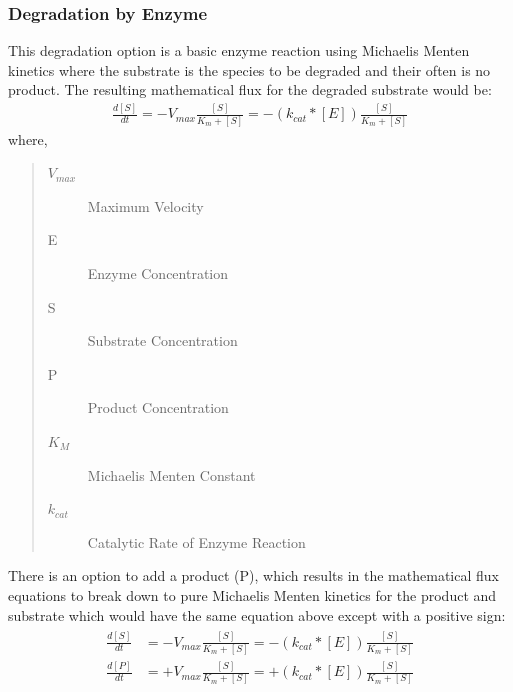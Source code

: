 \documentclass[letterpaper,10pt,english]{sphinxmanual}
\begin{document}
\subsubsection{Degradation by Enzyme}
\label{\detokenize{pages/backend/eqn_info/4_degradation:degradation-by-enzyme}}
\sphinxAtStartPar
This degradation option is a basic enzyme reaction using Michaelis Menten
kinetics where the substrate is the species to be degraded and their often
is no product. The resulting mathematical flux for the degraded substrate
would be:
\begin{equation*}
\begin{split}\frac{d[S]}{dt} = -V_{max}\frac{[S]}{K_m+[S]} =
-(k_{cat}*[E])\frac{[S]}{K_m+[S]}\end{split}
\end{equation*}
\sphinxAtStartPar
where,
\begin{quote}\begin{description}
\item[{\(V_{max}\)}] \leavevmode
\sphinxAtStartPar
Maximum Velocity

\item[{E}] \leavevmode
\sphinxAtStartPar
Enzyme Concentration

\item[{S}] \leavevmode
\sphinxAtStartPar
Substrate Concentration

\item[{P}] \leavevmode
\sphinxAtStartPar
Product Concentration

\item[{\(K_M\)}] \leavevmode
\sphinxAtStartPar
Michaelis Menten Constant

\item[{\(k_{cat}\)}] \leavevmode
\sphinxAtStartPar
Catalytic Rate of Enzyme Reaction

\end{description}\end{quote}

\sphinxAtStartPar
There is an option to add a product (P), which results in the mathematical
flux equations to break down to pure Michaelis Menten kinetics for the product
and substrate which would have the same equation above except with a positive
sign:
\begin{equation*}
\begin{split}\begin{align*}
    \frac{d[S]}{dt} &= -V_{max}\frac{[S]}{K_m+[S]} =
    -(k_{cat}*[E])\frac{[S]}{K_m+[S]} \\
    \frac{d[P]}{dt} &= +V_{max}\frac{[S]}{K_m+[S]} =
    +(k_{cat}*[E])\frac{[S]}{K_m+[S]}
\end{align*}\end{split}
\end{equation*}
\end{document}
